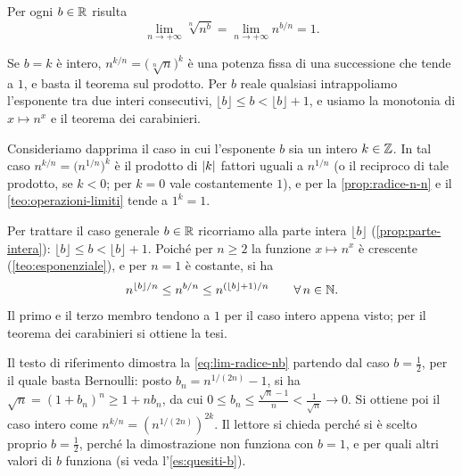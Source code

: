 \begin{corollario}\label{cor:radice-n-nb}
Per ogni $b\in\mathbb{R}$ risulta
\begin{equation}\label{eq:lim-radice-nb}
  \lim_{n\to+\infty}\sqrt[n]{n^{b}}=\lim_{n\to+\infty}n^{b/n}=1 .
\end{equation}
\end{corollario}

\begin{schema}
\end{schema}

\begin{strategia}
Se $b=k$ è intero, $n^{k/n}=\bigl(\sqrt[n]n\bigr)^{k}$ è una potenza fissa di una
successione che tende a $1$, e basta il teorema sul prodotto. Per $b$ reale qualsiasi
intrappoliamo l'esponente tra due interi consecutivi, $\lfloor b\rfloor\le b<\lfloor
b\rfloor+1$, e usiamo la monotonia di $x\mapsto n^{x}$ e il teorema dei carabinieri.
\end{strategia}

\begin{dimostrazione}
Consideriamo dapprima il caso in cui l'esponente $b$ sia un intero $k\in\mathbb{Z}$. In tal caso
$n^{k/n}=\bigl(n^{1/n}\bigr)^{k}$ è il prodotto di $\lvert k\rvert$ fattori uguali a $n^{1/n}$ (o
il reciproco di tale prodotto, se $k<0$; per $k=0$ vale costantemente $1$), e per la
\cref{prop:radice-n-n} e il \cref{teo:operazioni-limiti} tende a $1^{k}=1$.

Per trattare il caso generale $b\in\mathbb{R}$ ricorriamo alla parte intera $\lfloor b\rfloor$
(\cref{prop:parte-intera}): $\lfloor b\rfloor\le b<\lfloor b\rfloor+1$. Poiché per $n\ge2$
la funzione $x\mapsto n^{x}$ è crescente (\cref{teo:esponenziale}), e per $n=1$ è
costante, si ha
\begin{equation}\label{eq:radice-nb-stima}
  n^{\lfloor b\rfloor/n}\le n^{b/n}\le n^{(\lfloor b\rfloor+1)/n} \qquad\forall\, n\in\mathbb{N} .
\end{equation}
Il primo e il terzo membro tendono a $1$ per il caso intero appena visto; per il teorema
dei carabinieri si ottiene la tesi.
\end{dimostrazione}

\begin{osservazione}
Il testo di riferimento \cite{marcellini-sbordone} dimostra la \eqref{eq:lim-radice-nb}
partendo dal caso $b=\frac12$, per il quale basta Bernoulli: posto $b_{n}=n^{1/(2n)}-1$,
si ha $\sqrt n=(1+b_{n})^{n}\ge1+nb_{n}$, da cui
$0\le b_{n}\le\frac{\sqrt n-1}{n}<\frac1{\sqrt n}\to0$. Si ottiene poi il caso intero
come $n^{k/n}=(n^{1/(2n)})^{2k}$. Il lettore si chieda perché si è scelto proprio
$b=\frac12$, perché la dimostrazione non funziona con $b=1$, e per quali altri valori di
$b$ funziona (si veda l'\cref{es:quesiti-b}).
\end{osservazione}

